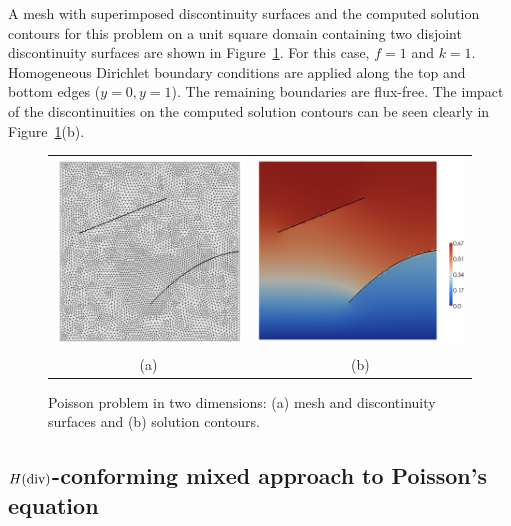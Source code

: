 A mesh with superimposed discontinuity surfaces and
the computed solution contours for this problem on a unit square
domain containing two disjoint discontinuity surfaces are shown in
Figure~\ref{fig:nikbakht:poisson_contours}.  For this case, $f = 1$ and $k
= 1$.  Homogeneous Dirichlet boundary conditions are applied along the top
and bottom edges ($y = 0, y = 1$). The remaining boundaries are flux-free.
The impact of the discontinuities on the  computed solution contours
can be seen clearly in Figure~\ref{fig:nikbakht:poisson_contours}(b).
%
\begin{figure}
\begin{tabular}{cc}
  \includegraphics[height=0.45\textwidth]{chapters/nikbakht/png/mesh.png}
&
   \includegraphics[height=0.45\textwidth]{chapters/nikbakht/png/result.png}
\\
(a) & (b)
\end{tabular}
\caption{Poisson problem in two dimensions: (a) mesh and discontinuity
surfaces and (b) solution contours.}
\label{fig:nikbakht:poisson_contours}
\end{figure}
\subsection{$H(\rm div)$-conforming mixed approach to Poisson's equation}

